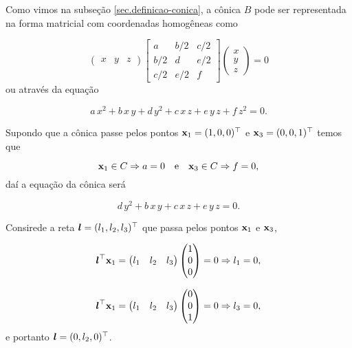 Como vimos na subseção \ref{sec.definicao-conica}, a cônica $B$ pode ser representada na forma matricial com coordenadas homogêneas como

\begin{equation*}
\begin{pmatrix}
x&y&z
\end{pmatrix}
\begin{bmatrix}
a&b/2&c/2\\
b/2&d&e/2\\
c/2&e/2&f
\end{bmatrix}
\begin{pmatrix}
x\\
y\\
z
\end{pmatrix}
=0
\end{equation*}
ou através da equação

\begin{equation*}
a\,x^2+b\,x\,y+d\,y^2+c\,x\,z+e\,y\,z+f\,z^2=0.
\end{equation*}

Supondo que a cônica passe pelos pontos $\mathbf{x}_1=(1,0,0)^\top$ e $\mathbf{x}_3=(0,0,1)^\top$ temos que

\begin{equation*}
\mathbf{x}_1\in C\Rightarrow a=0\quad\text{e}\quad\mathbf{x}_3\in C\Rightarrow f=0,
\end{equation*}
daí a equação da cônica será 

\begin{equation}\label{eq.reducao-parcial-conica}
d\,y^2+b\,x\,y+c\,x\,z+e\,y\,z=0.
\end{equation}

Consirede a reta $\boldsymbol{l}=(l_1,l_2,l_3)^\top$ que passa pelos pontos $\mathbf{x}_1$ e $\mathbf{x}_3$,

\begin{equation*}
\boldsymbol{l}^\top\mathbf{x}_1=
\begin{pmatrix}
l_1&l_2&l_3
\end{pmatrix}
\begin{pmatrix}
1\\
0\\
0
\end{pmatrix}
=0
\Rightarrow l_1=0,
\end{equation*} 

\begin{equation*}
\boldsymbol{l}^\top\mathbf{x}_1=
\begin{pmatrix}
l_1&l_2&l_3
\end{pmatrix}
\begin{pmatrix}
0\\
0\\
1
\end{pmatrix}
=0
\Rightarrow l_3=0,
\end{equation*} 
e portanto $\boldsymbol{l}=(0,l_2,0)^\top$.

